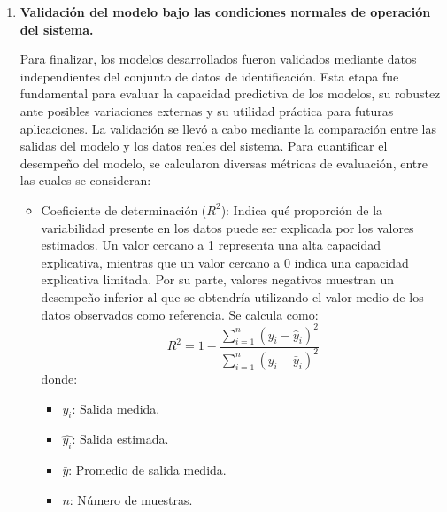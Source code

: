 \documentclass[11pt]{report}
\begin{document}
\begin{enumerate}
Respecto del entorno computacional, se utilizaron herramientas de software libre debido a las limitaciones del proyecto. Por esta razón, Python fue seleccionado como entorno principal por su flexibilidad, amplia disponibilidad de bibliotecas científicas y de aprendizaje automático, su facilidad de integración con bases de datos y su creciente uso en el ámbito académico e industrial. Aunque existen otras opciones de código abierto como R, Julia o GNU Octave, Python ofrece un equilibrio entre capacidades numéricas, documentación y facilidad de uso.

\item \textbf{Validación del modelo bajo las condiciones normales de operación del sistema.}

Para finalizar, los modelos desarrollados fueron validados mediante datos independientes del conjunto de datos de identificación. Esta etapa fue fundamental para evaluar la capacidad predictiva de los modelos, su robustez ante posibles variaciones externas y su utilidad práctica para futuras aplicaciones.
La validación se llevó a cabo mediante la comparación entre las salidas del modelo y los datos reales del sistema. Para cuantificar el desempeño del modelo, se calcularon diversas métricas de evaluación, entre las cuales se consideran:
\begin{itemize}
     \item Coeficiente de determinación ($R^2$): Indica qué proporción de la variabilidad presente en los datos puede ser explicada por los valores estimados. Un valor cercano a 1 representa una alta capacidad explicativa, mientras que un valor cercano a 0 indica una capacidad explicativa limitada. Por su parte, valores negativos muestran un desempeño inferior al que se obtendría utilizando el valor medio de los datos observados como referencia. Se calcula como:
 \begin{equation} \label{coef de determinación}
        R^2 = 1 - \frac{\sum_{i=1}^{n} (y_i - \hat{y}_i)^2}{\sum_{i=1}^{n} (y_i - \bar{y}_i)^2}
\end{equation}
        donde:
        \begin{itemize}
            \item $y_i$: Salida medida.
            \item $\hat{y_i}$: Salida estimada.
            \item $\bar{y}$: Promedio de salida medida.
            \item $n$: Número de muestras.
        \end{itemize}
   

\end{itemize}
\end{enumerate}
\end{document}
